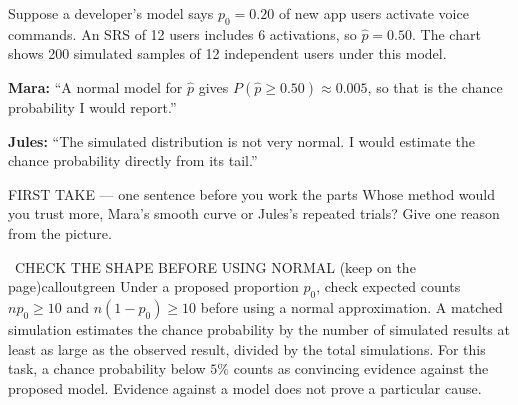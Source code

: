 \documentclass[11pt]{article}
\begin{document}


Suppose a developer's model says $p_0=0.20$ of new app users activate voice commands. An SRS of 12 users includes 6 activations, so $\hat p=0.50$. The chart shows 200 simulated samples of 12 independent users under this model.\par\smallskip \textbf{Mara:} ``A normal model for $\hat p$ gives $P(\hat p\ge 0.50)\approx0.005$, so that is the chance probability I would report.''\par \textbf{Jules:} ``The simulated distribution is not very normal. I would estimate the chance probability directly from its tail.''\par
\begin{center}
\end{center}
\begin{firsttakebox}{FIRST TAKE --- one sentence before you work the parts}
Whose method would you trust more, Mara's smooth curve or Jules's repeated trials? Give one reason from the picture.
\workspace{0.9in}
\end{firsttakebox}

\begin{callout}{\IconBook\ CHECK THE SHAPE BEFORE USING NORMAL (keep on the page)}{calloutgreen}
Under a proposed proportion $p_0$, check expected counts $np_0\geq10$ and $n(1-p_0)\geq10$ before using a normal approximation.
A matched simulation estimates the chance probability by the number of simulated results at least as large as the observed result, divided by the total simulations.
For this task, a chance probability below $5\%$ counts as convincing evidence against the proposed model.
Evidence against a model does not prove a particular cause.
\end{callout}
\end{document}
